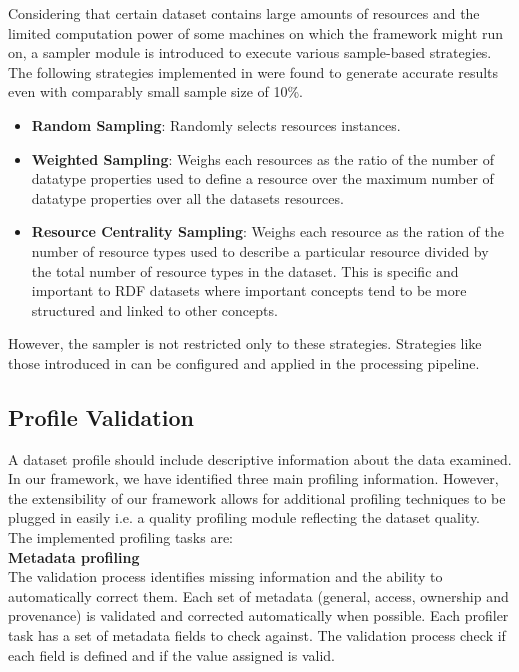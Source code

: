\documentclass[runningheads,a4paper]{llncs}
\begin{document}
Considering that certain dataset contains large amounts of resources and the limited computation power of some machines on which the framework might run on, a sampler module is introduced to execute various sample-based strategies. The following strategies implemented in \cite{scalableApproach} were found to generate accurate results even with comparably small sample size of 10\%.
\begin{itemize}
  \item \textbf{Random Sampling}: Randomly selects resources instances.
  \item \textbf{Weighted Sampling}: Weighs each resources as the ratio of the number of datatype properties used to define a resource over the maximum number of datatype properties over all the datasets resources.
  \item \textbf{Resource Centrality Sampling}: Weighs each resource as the ration of the number of resource types used to describe a particular resource divided by the total number of resource types in the dataset. This is specific and important to RDF datasets where important concepts tend to be more structured and linked to other concepts.
\end{itemize}

However, the sampler is not restricted only to these strategies. Strategies like those introduced in \cite{Leskovec:2006:SLG:1150402.1150479} can be configured and applied in the processing pipeline.

\subsection{Profile Validation}

A dataset profile should include descriptive information about the data examined. In our framework, we have identified three main profiling information. However, the extensibility of our framework allows for additional profiling techniques to be plugged in easily i.e. a quality profiling module reflecting the dataset quality.\\
The implemented profiling tasks are:\\

\textbf{Metadata profiling}\\

The validation process identifies missing information and the ability to automatically correct them. Each set of metadata (general, access, ownership and provenance) is validated and corrected automatically when possible. Each profiler task has a set of metadata fields to check against. The validation process check if each field is defined and if the value assigned is valid.
\end{document}
